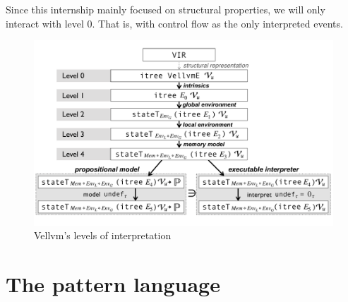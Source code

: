 \documentclass[11pt]{article}
\newcommand{\yz}[1]{\textcolor{ForestGreen}{#1}}
\newcommand{\yzt}[1]{\textcolor{ForestGreen!50}{#1}}
\newcommand{\ocfg}{OCFG\xspace}
\newcommand{\pat}{\texttt{Pat}\xspace}
\begin{document}
Since this internship mainly focused on structural properties, we will only interact with level 0. That is, with control flow as the only interpreted events.

\begin{figure}
  \includegraphics[width=\textwidth]{images/interp-figure.pdf}
  \caption{Vellvm's levels of interpretation}
  \label{fig:interp}
\end{figure}

\section{The pattern language}
\label{sec:lang}




\end{document}
